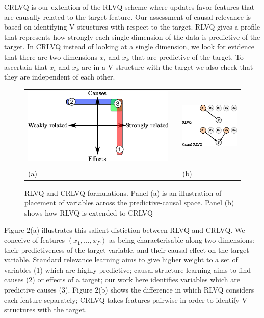 \documentclass{esannV2}
\begin{document}
CRLVQ is our extention of the RLVQ scheme where updates favor features that are causally related to the target feature. Our assessment of causal relevance is based on identifying V-structures with respect to the target. RLVQ gives a profile that represents how strongly each single dimension of the data is predictive of the target. In CRLVQ instead of looking at a single dimension, we look for evidence that there are two dimensions $x_i$ and $x_k$ that are predictive of the target. To ascertain that $x_i$ and $x_k$ are in a V-structure with the target we also check that they are independent of each other.

\begin{figure}
\begin{tabular}{m{}cm{}}
\includegraphics[width=.5\textwidth]{causal-relevance-dimensions.eps} & &
\includegraphics[width=.35\textwidth]{rlvq-crlvq.eps} \\
& \\
(a) & & (b)  
\end{tabular}
\label{fig:causes}
\caption{RLVQ and CRLVQ formulations. Panel (a) is an illustration of placement of variables across the predictive-causal space. Panel (b) shows how RLVQ is extended to CRLVQ}
\end{figure}

Figure 2(a) illustrates this salient distiction between RLVQ and CRLVQ. We conceive of features $(x_1, \ldots, x_P)$ as being characterisable along two dimensions: their predictiveness of the target variable, and their causal effect on the target variable. Standard relevance learning aims to give higher weight to a set of variables (1) which are highly predictive; causal structure learning aims to find causes (2) or effects of a target; our work here identifies variables which are predictive causes (3). Figure 2(b) shows the difference in which RLVQ considers each feature separately; CRLVQ takes features pairwise in order to identify V-structures with the target.
 
\end{document}
